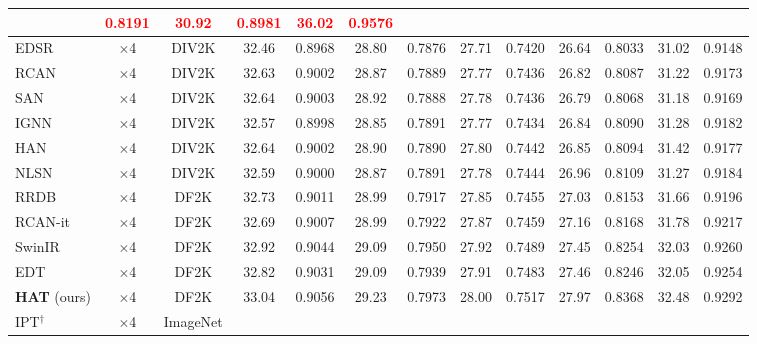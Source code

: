 \begin{table*}[!htbp]
\begin{center}
\begin{adjustbox}{width=\linewidth}
\begin{tabular}{|l|c|c|c|c|c|c|c|c|c|c|c|c|}
& \textcolor{red}{0.8191}
& \textcolor{red}{30.92}
& \textcolor{red}{0.8981}
& \textcolor{red}{36.02}
& \textcolor{red}{0.9576}
\\
\hline
\hline
EDSR~\cite{DBLP:conf/cvpr/LimSKNL17} & $\times$4 & DIV2K %
& 32.46
& 0.8968
& 28.80
& 0.7876
& 27.71
& 0.7420
& 26.64
& 0.8033
& 31.02
& 0.9148
\\
RCAN~\cite{DBLP:journals/corr/abs-2201-11279} & $\times$4 & DIV2K %
& 32.63
& 0.9002
& 28.87
& 0.7889
& 27.77
& 0.7436
& 26.82
& 0.8087
& 31.22
& 0.9173
\\
SAN~\cite{DBLP:conf/cvpr/DaiCZXZ19} & $\times$4 & DIV2K %
& {32.64}
& {0.9003}
& {28.92}
& {0.7888}
& {27.78}
& {0.7436}
& {26.79}
& {0.8068}
& {31.18}
& {0.9169}
\\
IGNN~\cite{zhou2020cross} & $\times$4 & DIV2K %
& {32.57}
& {0.8998}
& {28.85}
& {0.7891}
& {27.77}
& {0.7434}
& {26.84}
& {0.8090}
& {31.28}
& {0.9182}
\\
HAN~\cite{niu2020single} & $\times$4 & DIV2K %
& {32.64}
& {0.9002}
& {28.90}
& {0.7890}
& {27.80}
& {0.7442}
& {26.85}
& {0.8094}
& {31.42}
& {0.9177}
\\
NLSN~\cite{mei2021image} & $\times$4 & DIV2K %
& 32.59 
& 0.9000 
& 28.87 
& 0.7891 
& 27.78 
& 0.7444 
& {26.96}
& {0.8109}
& 31.27 
& 0.9184
\\
RRDB~\cite{DBLP:conf/iccvw/WangXDS21} & $\times$4 & DF2K %
& {32.73}
& {0.9011 }
& {28.99}
& {0.7917}
& {27.85}
& {0.7455}
& {27.03}
& {0.8153}
& {31.66}
& {0.9196}
\\
RCAN-it~\cite{DBLP:journals/corr/abs-2201-11279} & $\times$4 & DF2K %
& 32.69
& 0.9007
& 28.99
& 0.7922
& 27.87
& 0.7459
& 27.16
& 0.8168
& 31.78
& 0.9217
\\
SwinIR~\cite{DBLP:conf/iccvw/LiangCSZGT21} & $\times$4 & DF2K %
& 32.92
& 0.9044
& 29.09
& 0.7950
& 27.92
& 0.7489
& 27.45
& 0.8254
& 32.03
& 0.9260
\\
EDT~\cite{DBLP:journals/corr/abs-2112-10175} & $\times$4 & DF2K %
& 32.82
& 0.9031
& 29.09
& 0.7939
& 27.91
& 0.7483
& 27.46
& 0.8246
& 32.05
& 0.9254
\\
\textbf{HAT} (ours) & $\times$4 & DF2K %
& {33.04}
& {\color[HTML]{00BF01} 0.9056}
& {\color[HTML]{00BF01} 29.23}
& {\color[HTML]{00BF01} 0.7973}
& {\color[HTML]{00BF01} 28.00}
& {\color[HTML]{00BF01} 0.7517}
& {\color[HTML]{00BF01} 27.97}
& {\color[HTML]{00BF01} 0.8368}
& {\color[HTML]{00BF01} 32.48}
& {\color[HTML]{00BF01} 0.9292}
\\
\hdashline
IPT$^\dagger$~\cite{DBLP:conf/cvpr/Chen000DLMX0021} & $\times$4 & ImageNet %

\end{tabular}
\end{adjustbox}
\end{center}
\end{table*}
